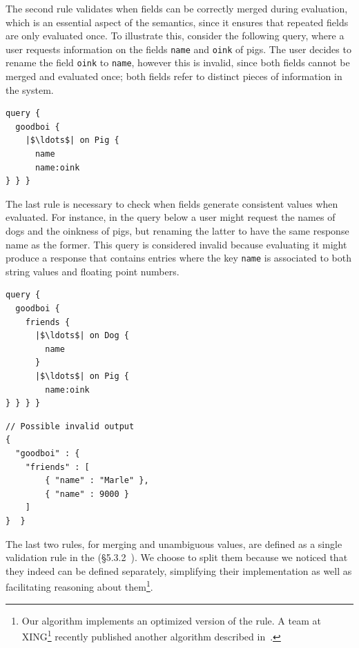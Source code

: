 The second rule validates when fields can be correctly merged during evaluation, which is an essential aspect of the semantics, since it ensures that repeated fields are only evaluated once. To illustrate this, consider the following query, where a user requests information on the fields \texttt{name} and \texttt{oink} of pigs. The user decides to rename the field \texttt{oink} to \texttt{name}, however this is invalid, since both fields cannot be merged and evaluated once; both fields refer to distinct pieces of information in the system.

\begin{verbatim}
query {
  goodboi {
    |$\ldots$| on Pig {
	  name
	  name:oink
} } }
\end{verbatim}

The last rule is necessary to check when fields generate consistent values when evaluated. For instance, in the query below a user might request the names of dogs and the oinkness of pigs, but renaming the latter to have the same response name as the former. This query is considered invalid because evaluating it might produce a response that contains entries where the key \texttt{name} is associated to both string values and floating point numbers. 

\begin{minipage}[t]{.22\textwidth}
\begin{verbatim}
query {
  goodboi {
    friends {
      |$\ldots$| on Dog {
        name
      }
      |$\ldots$| on Pig {
        name:oink
} } } }
\end{verbatim}
\end{minipage}%
\begin{minipage}[t]{.22\textwidth}
\begin{verbatim}
// Possible invalid output
{
  "goodboi" : {
    "friends" : [
        { "name" : "Marle" },
        { "name" : 9000 }
    ]
}  }
\end{verbatim}
\end{minipage}


The last two rules, for merging and unambiguous values, are defined as a single validation rule in the \spec (\cf\S5.3.2~\cite{gqlspec}). 
We choose to split them because we noticed that they indeed can be defined separately, simplifying their implementation as well as facilitating 
reasoning about them\footnote{Our algorithm implements an optimized version of the rule. A team at XING\footnote{https://www.xing.com/} recently published another algorithm described in~\cite{xingalg}.}.


